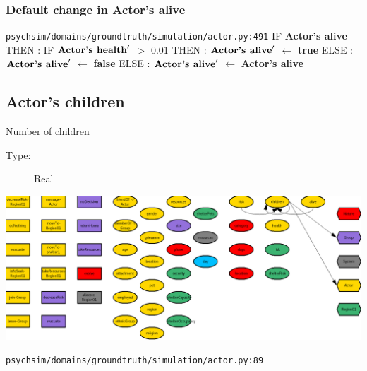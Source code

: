 \documentclass{article}%
\begin{document}
\subsubsection{Default change in Actor's alive}%
\label{ssubsec:Default change in Actor's alive}%
\begin{flushleft}%
\verb|psychsim/domains/groundtruth/simulation/actor.py:491|%
\linebreak%
IF %
\textbf{Actor's alive}%
\linebreak%
\hspace*{2em}%
THEN %
: %
IF %
$\mbox{\textbf{Actor's health}} '$%
$>$%
0.01%
\linebreak%
\hspace*{4em}%
THEN %
: %
$\mbox{\textbf{Actor's alive}} '$%
$\leftarrow$%
\textbf{true}%
\linebreak%
\hspace*{4em}%
ELSE %
: %
$\mbox{\textbf{Actor's alive}} '$%
$\leftarrow$%
\textbf{false}%
\linebreak%
\hspace*{2em}%
ELSE %
: %
$\mbox{\textbf{Actor's alive}} '$%
$\leftarrow$%
\textbf{Actor's alive}%
\end{flushleft}

%
\subsection{Actor's children}%
\label{subsec:Actor's children}%
Number of children%
\begin{description}%
\item[Type:]%
Real%
\end{description}%
\includegraphics[width=\textwidth]{images/childrenOfActor.png}%
\begin{flushleft}%
\verb|psychsim/domains/groundtruth/simulation/actor.py:89|%
\end{flushleft}

%
\end{document}
